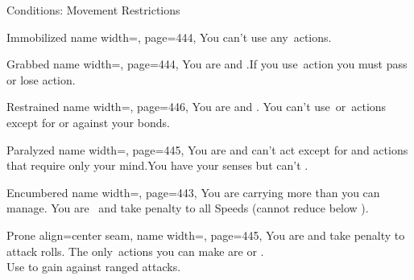 \begin{PageFront}
\begin{Tables}{\frontTableHeight}
\begin{Table}{Conditions: Movement Restrictions}
            \begin{entry}{Immobilized}{%
                name width=\conditionLength,%
                page=444,
            }
                You can't use any \Move\,actions.\hfill {}
            \end{entry}
            \begin{entry}{Grabbed}{%
                name width=\conditionLength,%
                page=444,
            }
                You are \OffGuard and \Immobilized.\hfill If you use \Manipulate\,action you must pass
                \Flat[][val=5] or lose action.
            \end{entry}
            \begin{entry}{Restrained}{%
                name width=\conditionLength,%
                page=446,
            }
                You are \OffGuard and \Immobilized. You can't use \Attack\,or \Manipulate\,actions except
                for  or  against your bonds. \hfill{}
            \end{entry}
            \begin{entry}{Paralyzed}{%
                name width=\conditionLength,%
                page=445,
            }
                You are \OffGuard and can't act except for  and actions that require
                only your mind.\hfill  You have your senses but can't .
            \end{entry}
            \breakLine
            \begin{entry}{Encumbered}{%
                name width=\conditionLength,%
                page=443,
            }
                You are carrying more than you can manage. \hfill You are \Clumsy\, and take  penalty to all Speeds {(cannot reduce below  \Feet)}.
            \end{entry}
            \begin{entry}{Prone}{%
                align=center seam,
                name width=\conditionLength,%
                page=445,
            }
                You are \OffGuard and take  \Cirm penalty to attack rolls. \hfill The only \Move\,actions you
                can make are  or .\\
                Use  to gain \GCover against ranged attacks. \hfill{}
\end{entry}
\end{Table}
\end{Tables}
\end{PageFront}
